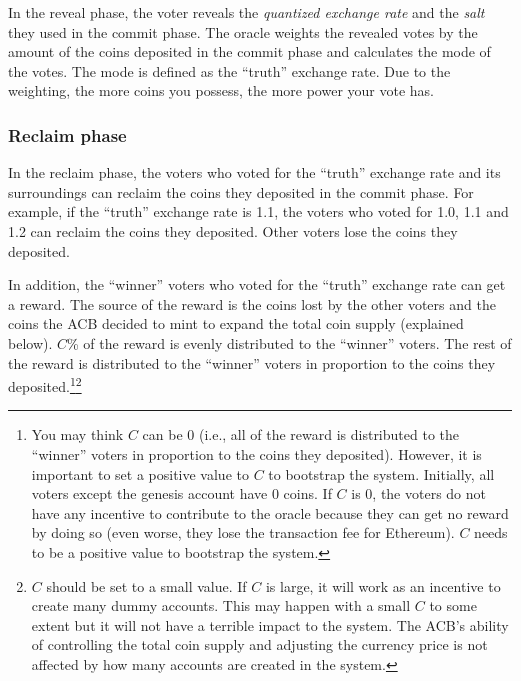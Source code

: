 \documentclass[dvipdfmx,a4paper]{article}
\begin{document}
In the reveal phase, the voter reveals the \textit{quantized exchange rate} and the \textit{salt} they used in the commit phase. The oracle weights the revealed votes by the amount of the coins deposited in the commit phase and calculates the mode of the votes. The mode is defined as the ``truth'' exchange rate. Due to the weighting, the more coins you possess, the more power your vote has.

\subsubsection{Reclaim phase}

In the reclaim phase, the voters who voted for the ``truth'' exchange rate and its surroundings can reclaim the coins they deposited in the commit phase. For example, if the ``truth'' exchange rate is 1.1, the voters who voted for 1.0, 1.1 and 1.2 can reclaim the coins they deposited. Other voters lose the coins they deposited.

In addition, the ``winner'' voters who voted for the ``truth'' exchange rate can get a reward. The source of the reward is the coins lost by the other voters and the coins the ACB decided to mint to expand the total coin supply (explained below). $C$\% of the reward is evenly distributed to the ``winner'' voters. The rest of the reward is distributed to the ``winner'' voters in proportion to the coins they deposited.\footnote{You may think $C$ can be 0 (i.e., all of the reward is distributed to the ``winner'' voters in proportion to the coins they deposited). However, it is important to set a positive value to $C$ to bootstrap the system. Initially, all voters except the genesis account have 0 coins. If $C$ is 0, the voters do not have any incentive to contribute to the oracle because they can get no reward by doing so (even worse, they lose the transaction fee for Ethereum). $C$ needs to be a positive value to bootstrap the system.}\footnote{$C$ should be set to a small value. If $C$ is large, it will work as an incentive to create many dummy accounts. This may happen with a small $C$ to some extent but it will not have a terrible impact to the system. The ACB's ability of controlling the total coin supply and adjusting the currency price is not affected by how many accounts are created in the system.}
\end{document}
